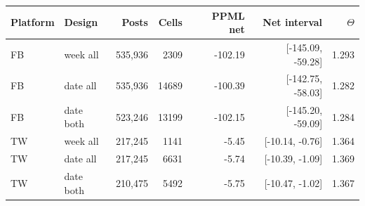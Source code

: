 \begin{tabular}{llrrrrr}
\toprule
Platform & Design & Posts & Cells & PPML net & Net interval & $\Theta$ \\
\midrule
FB & week all & 535,936 & 2309 & -102.19 & [-145.09, -59.28] & 1.293 \\
FB & date all & 535,936 & 14689 & -100.39 & [-142.75, -58.03] & 1.282 \\
FB & date both & 523,246 & 13199 & -102.15 & [-145.20, -59.09] & 1.284 \\
TW & week all & 217,245 & 1141 & -5.45 & [-10.14, -0.76] & 1.364 \\
TW & date all & 217,245 & 6631 & -5.74 & [-10.39, -1.09] & 1.369 \\
TW & date both & 210,475 & 5492 & -5.75 & [-10.47, -1.02] & 1.367 \\
\bottomrule
\end{tabular}
